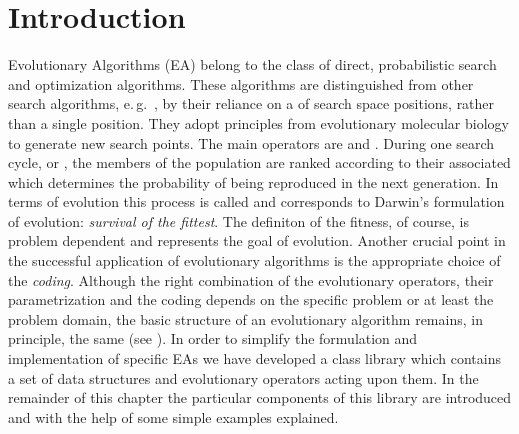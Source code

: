 %
%
\section{Introduction}

Evolutionary Algorithms (EA) belong to the class of direct,
probabilistic search and optimization algorithms.  These algorithms
are distinguished from other search algorithms, e.\,g.\ , by their reliance on a \emph{} of search space
positions, rather than a single position.  They adopt principles from
evolutionary molecular biology to generate new search points.  The
main operators are \emph{} and \emph{}.  During
one search cycle, or \emph{}, the members of the population
are ranked according to their associated \emph{} which
determines the probability of being reproduced in the next generation.
In terms of evolution this process is called \emph{} and
corresponds to Darwin's formulation of evolution: \emph{survival of
the fittest}. The definiton of the fitness, of course, is problem
dependent and represents the goal of evolution.  Another crucial point
in the successful application of evolutionary algorithms is the
appropriate choice of the \emph{coding}.  Although the right
combination of the evolutionary operators, their parametrization and
the coding depends on the specific problem or at least the problem
domain, the basic structure of an evolutionary algorithm remains, in
principle, the same (see ).  In order to
simplify the formulation and implementation of specific EAs we have
developed a class library which contains a set of data structures and
evolutionary operators acting upon them.  In the remainder of this
chapter the particular components of this library are introduced and
with the help of some simple examples explained.

